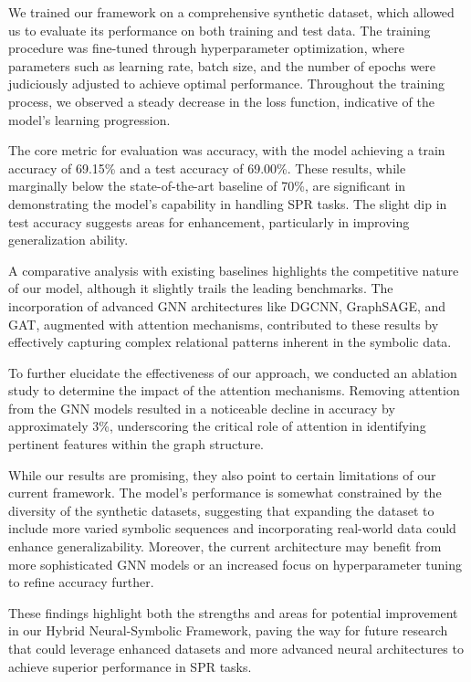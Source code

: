 \documentclass{article}
\begin{document}
We trained our framework on a comprehensive synthetic dataset, which allowed us to evaluate its performance on both training and test data. The training procedure was fine-tuned through hyperparameter optimization, where parameters such as learning rate, batch size, and the number of epochs were judiciously adjusted to achieve optimal performance. Throughout the training process, we observed a steady decrease in the loss function, indicative of the model's learning progression.

The core metric for evaluation was accuracy, with the model achieving a train accuracy of 69.15\% and a test accuracy of 69.00\%. These results, while marginally below the state-of-the-art baseline of 70\%, are significant in demonstrating the model's capability in handling SPR tasks. The slight dip in test accuracy suggests areas for enhancement, particularly in improving generalization ability.

A comparative analysis with existing baselines highlights the competitive nature of our model, although it slightly trails the leading benchmarks. The incorporation of advanced GNN architectures like DGCNN, GraphSAGE, and GAT, augmented with attention mechanisms, contributed to these results by effectively capturing complex relational patterns inherent in the symbolic data.

To further elucidate the effectiveness of our approach, we conducted an ablation study to determine the impact of the attention mechanisms. Removing attention from the GNN models resulted in a noticeable decline in accuracy by approximately 3\%, underscoring the critical role of attention in identifying pertinent features within the graph structure.

While our results are promising, they also point to certain limitations of our current framework. The model's performance is somewhat constrained by the diversity of the synthetic datasets, suggesting that expanding the dataset to include more varied symbolic sequences and incorporating real-world data could enhance generalizability. Moreover, the current architecture may benefit from more sophisticated GNN models or an increased focus on hyperparameter tuning to refine accuracy further.

These findings highlight both the strengths and areas for potential improvement in our Hybrid Neural-Symbolic Framework, paving the way for future research that could leverage enhanced datasets and more advanced neural architectures to achieve superior performance in SPR tasks.
\end{document}
